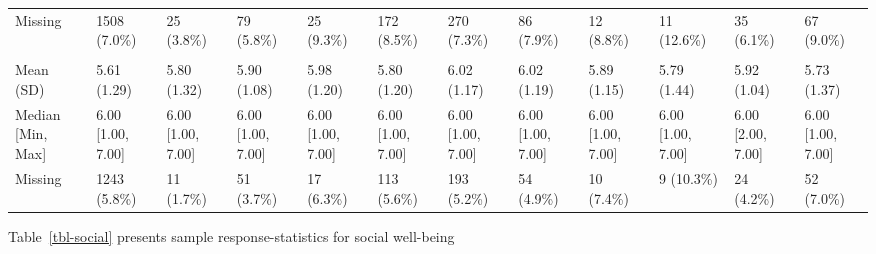 \documentclass[
  single column]{article}
\begin{document}
\begin{landscape}
\begin{longtable}[t]{llllllllllll}
\hspace{1em}Missing & 1508 (7.0\%) & 25 (3.8\%) & 79 (5.8\%) & 25 (9.3\%) & 172 (8.5\%) & 270 (7.3\%) & 86 (7.9\%) & 12 (8.8\%) & 11 (12.6\%) & 35 (6.1\%) & 67 (9.0\%)\\
\addlinespace[0.3em]
\multicolumn{12}{l}{\textbf{Meaning: Sense}}\\
\hspace{1em}Mean (SD) & 5.61 (1.29) & 5.80 (1.32) & 5.90 (1.08) & 5.98 (1.20) & 5.80 (1.20) & 6.02 (1.17) & 6.02 (1.19) & 5.89 (1.15) & 5.79 (1.44) & 5.92 (1.04) & 5.73 (1.37)\\
\hspace{1em}Median [Min, Max] & 6.00 [1.00, 7.00] & 6.00 [1.00, 7.00] & 6.00 [1.00, 7.00] & 6.00 [1.00, 7.00] & 6.00 [1.00, 7.00] & 6.00 [1.00, 7.00] & 6.00 [1.00, 7.00] & 6.00 [1.00, 7.00] & 6.00 [1.00, 7.00] & 6.00 [2.00, 7.00] & 6.00 [1.00, 7.00]\\
\hspace{1em}Missing & 1243 (5.8\%) & 11 (1.7\%) & 51 (3.7\%) & 17 (6.3\%) & 113 (5.6\%) & 193 (5.2\%) & 54 (4.9\%) & 10 (7.4\%) & 9 (10.3\%) & 24 (4.2\%) & 52 (7.0\%)\\*

\end{longtable}

\endgroup{}


\end{landscape}

\newpage{}

Table~\ref{tbl-social} presents sample response-statistics for social
well-being
\end{document}
